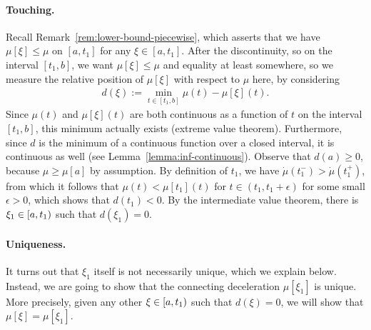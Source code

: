 \documentclass[a4paper]{article}
\theoremstyle{definition}
\theoremstyle{plain}
\begin{document}
\paragraph{Touching.}
Recall Remark~\ref{rem:lower-bound-piecewise}, which asserts that we have
$\mu[\xi] \leq \mu$ on $[a,t_{1}]$ for any $\xi \in [a, t_{1}]$.
%
After the discontinuity, so on the interval $[t_{1}, b]$, we want
$\mu[\xi] \leq \mu$ and equality at least somewhere, so we measure the relative
position of $\mu[\xi]$ with respect to $\mu$ here, by considering
\begin{align}
  d(\xi) := \min_{t \in [t_{1}, b]} \mu(t) - \mu[\xi](t) .
\end{align}
Since $\mu(t)$ and $\mu[\xi](t)$ are both continuous as a function of $t$ on the interval
$[t_{1}, b]$, this minimum actually exists (extreme value theorem).
%
Furthermore, since $d$ is the minimum of a continuous function over a closed
interval, it is continuous as well (see Lemma~\ref{lemma:inf-continuous}).
%
Observe that $d(a) \geq 0$, because $\mu \geq \mu[a]$ by assumption.
%
By definition of $t_{1}$, we have $\dot{\mu}(t_{1}^{-}) > \dot{\mu}(t_{1}^{+})$,
from which it follows that $\mu(t) < \mu[t_{1}](t)$ for $ t\in (t_{1}, t_{1} + \epsilon)$ for some
small $\epsilon > 0$, which shows that $d(t_{1}) < 0$.
%
By the intermediate value theorem, there is $\xi_{1} \in [a,t_{1})$ such
that $d(\xi_{1}) = 0$.


\paragraph{Uniqueness.}
It turns out that $\xi_{1}$ itself is not necessarily unique, which we explain
below. Instead, we are going to show that the connecting deceleration
$\mu[\xi_{1}]$ is unique. More precisely, given any other $\xi \in [a,t_{1})$ such
that $d(\xi) = 0$, we will show that $\mu[\xi] = \mu[\xi_{1}]$.
\end{document}
